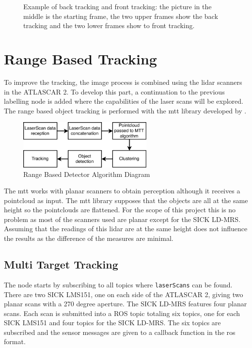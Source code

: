\begin{figure}[htp]
	\caption{Example of back tracking and front tracking: the picture in the middle is the starting frame, the two upper frames show the back tracking and the two lower frames show to front tracking.}
	\label{fig:tracking}
	
\end{figure}

\section{Range Based Tracking}

To improve the tracking, the image process is combined using the \gls{lidar} scanners in the ATLASCAR 2. To develop this part, a continuation to the previous labelling node is added where the capabilities of the laser scans will be explored. The range based object tracking is performed with the \gls{mtt} library developed by \cite{SoaresDeAlmeida2016a}. 


\begin{figure}[htp]
	
	\centering
	\includegraphics[width=0.6\textwidth]{caplabel/imgs/mttdiagram.pdf}
	
	\caption{Range Based Detector Algorithm Diagram}
	\label{fig:mttdiagram}
	
\end{figure}


The \gls{mtt} works with planar scanners to obtain perception although it receives a pointcloud as input. The \gls{mtt} library supposes that the objects are all at the same height so the pointclouds are flattened. For the scope of this project this is no problem as most of the scanners used are planar except for the SICK LD-MRS. Assuming that the readings of this \gls{lidar} are at the same height does not influence the results as the difference of the measures are minimal. 

\subsection{Multi Target Tracking}

The node starts by subscribing to all topics where \texttt{laserScans} can be found. There are two SICK LMS151, one on each side of the ATLASCAR 2, giving two planar scans with a 270 degree aperture. The SICK LD-MRS features four planar scans. Each scan is submitted into a ROS topic totaling six topics, one for each SICK LMS151 and four topics for the SICK LD-MRS. The six topics are subscribed and the sensor messages are given to a callback function in the \gls{ros} format.


